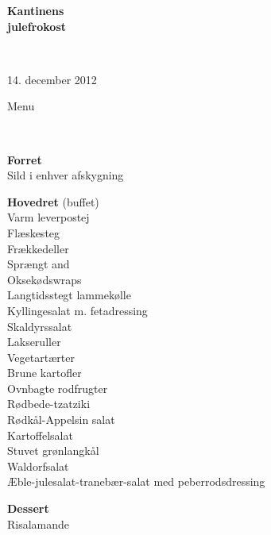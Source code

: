 \begin{center}
\begin{HUGE}
\textbf{Kantinens \\[3mm] julefrokost}
\end{HUGE}
\\[.6cm]
\begin{Large}
14. december 2012
\end{Large}
\end{center}
\vspace*{.4cm}
\begin{flushleft}
\begin{huge}
Menu
\end{huge}
\\[.1cm]
\newcommand{\course}[1]{\vspace*{4mm} \textbf{#1} \vspace{1mm}}
{\small
\course{Forret}
\\ Sild i enhver afskygning

\course{Hovedret} (buffet)
\\ Varm leverpostej
\\ Flæskesteg
\\ Frækkedeller
\\ Sprængt and
\\ Oksekødswraps
\\ Langtidsstegt lammekølle
\\ Kyllingesalat m. fetadressing
\\[2mm] Skaldyrssalat
\\ Lakseruller
\\[2mm] Vegetartærter
\\ Brune kartofler
\\ Ovnbagte rodfrugter
\\ Rødbede-tzatziki
\\ Rødkål-Appelsin salat
\\ Kartoffelsalat
\\ Stuvet grønlangkål
\\ Waldorfsalat
\\ Æble-julesalat-tranebær-salat med peberrodsdressing

\course{Dessert}
\\ Risalamande
}
\end{flushleft}


